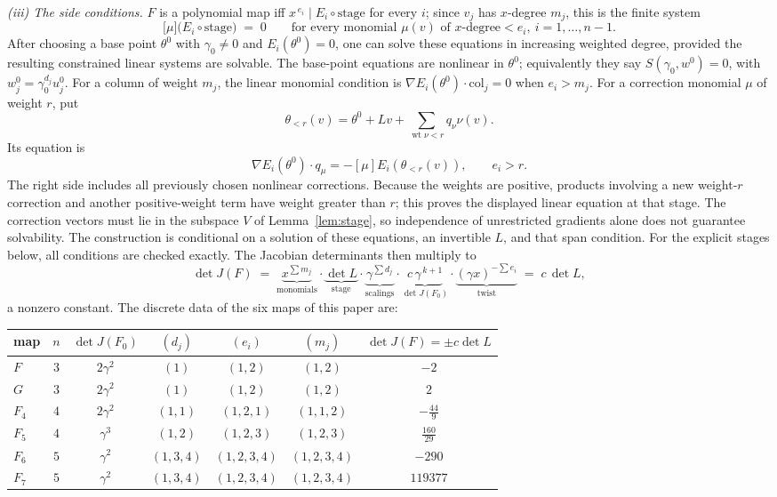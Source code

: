 \documentclass[11pt]{article}
\numberwithin{equation}{section}
\theoremstyle{plain}
\theoremstyle{definition}
\theoremstyle{remark}
\begin{document}
\emph{(iii) The side conditions.} $F$ is a polynomial map iff
$x^{\,e_i}\mid E_i\circ\text{stage}$ for every $i$; since $v_j$ has
$x$-degree $m_j$, this is the finite system
\begin{equation}\label{eq:side}
\bigl[\mu\bigr]\bigl(E_i\circ\text{stage}\bigr)\;=\;0
\qquad\text{for every monomial $\mu(v)$ of $x$-degree}<e_i,\ i=1,\dots,n-1 .
\end{equation}
After choosing a base point $\theta^0$ with $\gamma_0\ne0$ and
$E_i(\theta^0)=0$, one can solve these equations in increasing weighted
degree, provided the resulting constrained linear systems are solvable.
The base-point equations are nonlinear in $\theta^0$; equivalently they
say $S(\gamma_0,w^0)=0$, with $w_j^0=\gamma_0^{d_j}u_j^0$.
For a column of weight $m_j$, the linear monomial condition is
$\nabla E_i(\theta^0)\cdot\mathrm{col}_j=0$ when $e_i>m_j$.
For a correction monomial $\mu$ of weight $r$, put
\[
 \theta_{<r}(v)=\theta^0+Lv+
 \sum_{\operatorname{wt}\nu<r}q_\nu\nu(v).
\]
Its equation is
\[
 \nabla E_i(\theta^0)\cdot q_\mu
 =-[\mu]E_i(\theta_{<r}(v)),\qquad e_i>r.
\]
The right side includes all previously chosen nonlinear corrections.
Because the weights are positive, products involving a new weight-$r$
correction and another positive-weight term have weight greater than $r$;
this proves the displayed linear equation at that stage.
The correction vectors must lie in the subspace $V$ of
Lemma~\ref{lem:stage}, so independence of unrestricted gradients alone
does not guarantee solvability. The construction is conditional on a
solution of these equations, an invertible $L$, and that span condition.
For the explicit stages below, all conditions are checked exactly.
The Jacobian determinants then multiply to
\begin{equation}\label{eq:chain}
\det J(F)\;=\;
\underbrace{x^{\sum m_j}}_{\text{monomials}}\cdot
\underbrace{\det L}_{\text{stage}}\cdot
\underbrace{\gamma^{\sum d_j}}_{\text{scalings}}\cdot
\underbrace{c\,\gamma^{\,k+1}}_{\det J(F_0)}\cdot
\underbrace{(\gamma x)^{-\sum e_i}}_{\text{twist}}
\;=\;c\,\det L ,
\end{equation}
a nonzero constant. The discrete data of the six maps of this paper are:
\begin{center}
\begin{tabular}{lcccccc}
\hline
map & $n$ & $\det J(F_0)$ & $(d_j)$ & $(e_i)$ & $(m_j)$ & $\det J(F)=\pm c\det L$\\
\hline
$F$   & $3$ & $2\gamma^2$ & $(1)$     & $(1,2)$     & $(1,2)$     & $-2$\\
$G$   & $3$ & $2\gamma^2$ & $(1)$     & $(1,2)$     & $(1,2)$     & $2$\\
$F_4$ & $4$ & $2\gamma^2$ & $(1,1)$   & $(1,2,1)$   & $(1,1,2)$   & $-\tfrac{44}{9}$\\
$F_5$ & $4$ & $\gamma^3$  & $(1,2)$   & $(1,2,3)$   & $(1,2,3)$   & $\tfrac{160}{29}$\\
$F_6$ & $5$ & $\gamma^2$  & $(1,3,4)$ & $(1,2,3,4)$ & $(1,2,3,4)$ & $-290$\\
$F_7$ & $5$ & $\gamma^2$  & $(1,3,4)$ & $(1,2,3,4)$ & $(1,2,3,4)$ & $119377$\\
\hline
\end{tabular}
\end{center}
\end{document}
